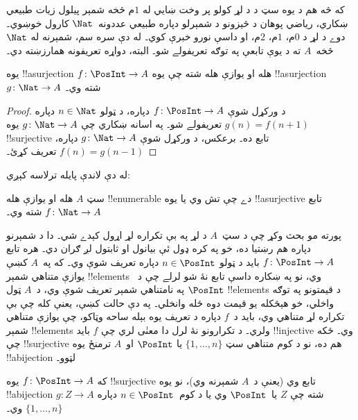 \documentclass[../../../include/open-logic-section]{subfiles}
\begin{document}
که څه هم د يوه سټ د  د لړ کولو پر وخت
ښايي له $1$م  څخه شمېر پيلول زيات طبيعي
ښکاري، رياضي پوهان د څيزونو د شمېرلو دپاره طبيعي عددونه~$\Nat$
کارول خوښوي۔ دوے د لړ د $0$م، $1$م، $2$م، او داسې نورو
 خبرې کوي۔ له دې سره سم، شمېرنه له
$\Nat$ څخه~$A$ ته د يوې  تابعې په توګه تعريفولے
شو۔ البته، دواړه تعريفونه همارزښته دي۔

\begin{prop}
  يوه !!a{surjection} $f\colon \PosInt \to A$ هله او يوازې هله
  شته چې يوه !!a{surjection} $g\colon \Nat \to A$ شته وي۔
\end{prop}

\begin{proof}
  د ورکړل شوې  $f\colon \PosInt \to A$ دپاره،
  د ټولو $n \in \Nat$ دپاره $g(n) = f(n+1)$ تعريفولے شو۔ په
  اسانه ښکاري چې $g\colon \Nat \to A$ يوه !!{surjective} تابع
  ده۔ برعکس، د ورکړل شوې  $g\colon \Nat \to A$
  دپاره، $f(n) = g(n-1)$ تعريف کړئ۔
\end{proof}

له دې لاندې پايله ترلاسه کېږي:

\begin{cor}
سټ $A$ هله او يوازې هله !!{enumerable} دے چې تش وي يا يوه
!!a{surjective} تابع $f\colon \Nat \to A$ شته وي۔
\end{cor}

پورته مو بحث وکړ چې د سټ~$A$ د  لړ په
بې تکراره لړ اړول کېدے شي۔ دا د شمېرنو دپاره هم رښتيا ده، خو
په کره ډول ئې بيانول او ثابتول لږ ګران دي۔ هره تابع
$f\colon \PosInt \to A$ بايد د ټولو $n \in \PosInt$ دپاره
تعريف شوې وي۔ که په~$A$ کښې يوازې متناهي شمېر !!{element}s وي،
نو په ښکاره داسې تابع نۀ شو لرلے چې د~$\PosInt$ په نامتناهي
شمېر  تعريف شوې وي، د~$A$ ټول
!!{element}s د قيمتونو په توګه واخلي، خو هېڅکله يو قيمت دوه
ځله وانخلي۔ په دې حالت کښې، يعنې کله چې بې تکراره لړ متناهي
وي، بايد د~$f$ دپاره د تعريف يوه بېله ساحه وټاکو، چې يوازې
متناهي شمېر !!{element}s ولري۔ د تکرارونو نۀ لرل دا معنٰی
لري چې $f$ بايد !!{injective} وي۔ ځکه چې !!{surjective} هم ده،
نو د کوم متناهي سټ $\{1, \dots, n\}$ يا $\PosInt$ او~$A$
ترمنځ يوه !!a{bijection} لټوو۔

\begin{prop}
که $f\colon \PosInt \to A$ يوه !!{surjective} تابع وي (يعنې
د~$A$ شمېرنه وي)، نو يوه !!a{bijection} $g\colon Z \to A$
شته چې $Z$ يا~$\PosInt$ وي يا د کوم~$n \in \PosInt$ دپاره
$\{1, \dots, n\}$ وي۔
\end{prop}
\end{document}
